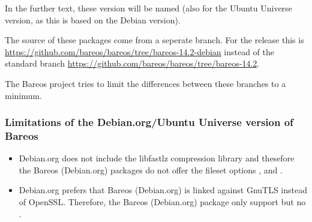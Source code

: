 In the further text, these version will be named  
(also for the Ubuntu Universe version, as this is based on the Debian version).

The source of these packages come from a seperate branch.
For the release  this is
\url{https://github.com/bareos/bareos/tree/bareos-14.2-debian} instead of the standard branch \url{https://github.com/bareos/bareos/tree/bareos-14.2}.

The Bareos project tries to limit the differences between these branches to a minimum.

\subsubsection{Limitations of the Debian.org/Ubuntu Universe version of Bareos}
\label{sec:DebianOrgLimitations}

    \begin{itemize}
        \item Debian.org does not include the libfastlz compression library and thesefore the Bareos (Debian.org) packages do not offer the fileset options ,  and .
        \item Debian.org prefers that Bareos (Debian.org) is linked against GnuTLS instead of OpenSSL. Therefore, the Bareos (Debian.org) package only support  but no .
    \end{itemize}
